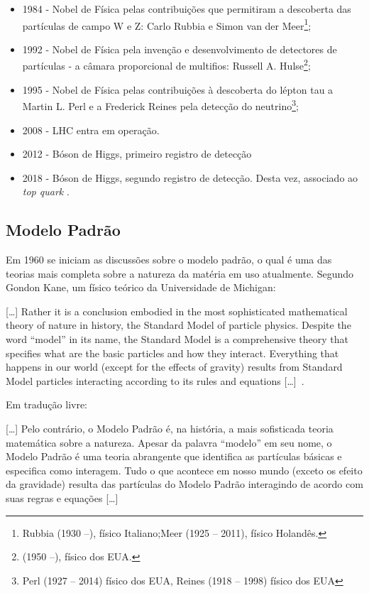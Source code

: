 \begin{itemize}
   \item 1984 - Nobel de Física pelas contribuições que permitiram a descoberta das partículas de campo W e Z: Carlo Rubbia e Simon van der Meer\footnote{Rubbia (1930 --), físico Italiano;Meer (1925 -- 2011), físico Holandês.};
   \item 1992 - Nobel de Física pela invenção e desenvolvimento de detectores de partículas - a câmara proporcional de multifios: Russell A. Hulse\footnote{(1950 --), físico dos EUA.};
   \item 1995 - Nobel de Física pelas contribuições à descoberta do lépton tau a  Martin L. Perl e a Frederick Reines pela detecção do neutrino\footnote{Perl (1927 -- 2014) físico dos EUA, Reines (1918 -- 1998) físico dos EUA};
   \item 2008 - LHC entra em operação.
   \item 2012 - Bóson de Higgs, primeiro registro de detecção \cite{atlas22012}
   \item 2018 - Bóson de Higgs, segundo registro de detecção. Desta vez, associado ao \textit{top quark} \cite{atlas2018}.
\end{itemize}

\subsection{Modelo Padrão}

Em 1960 se iniciam as discussões sobre o modelo padrão, o qual é uma das teorias mais completa sobre a natureza da matéria em uso atualmente. Segundo Gondon Kane, um físico teórico da Universidade de Michigan:

\begin{citacao}[english]
 {[\ldots]} Rather it is a conclusion embodied in the most sophisticated mathematical theory of nature in history, the Standard Model of particle physics. Despite the word ``model'' in its name, the Standard Model is a comprehensive theory that specifies what are the basic particles and how they interact. Everything that happens in our world (except for the effects of gravity) results from Standard Model particles interacting according to its rules and equations {[\ldots]}~\cite{kane2003}.
\end{citacao}	

Em tradução livre:

\begin{citacao}
{[\ldots]} Pelo contrário, o Modelo Padrão é, na história, a mais sofisticada teoria matemática sobre a natureza. Apesar da palavra ``modelo'' em seu nome, o Modelo Padrão é uma teoria abrangente que identifica as partículas básicas e especifica como interagem. Tudo o que acontece em nosso mundo (exceto os efeito da gravidade) resulta das partículas do Modelo Padrão interagindo de acordo com suas regras e equações {[\ldots]}
\end{citacao}



